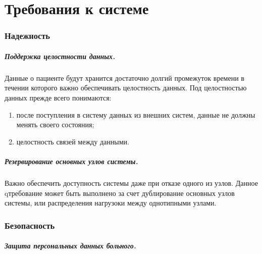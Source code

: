 \section{Требования к системе}

\subsubsection{Надежность}
\subparagraph{Поддержка целостности данных.}
Данные о пациенте будут хранится достаточно долгий промежуток времени в течении которого важно обеспечивать целостность данных. Под целостностью данных прежде всего понимаются:

\begin{enumerate}
  \item после поступления в систему данных из внешних систем, данные не должны
  менять своего состояния;
  \item целостность связей между данными. 
\end{enumerate}

\subparagraph{Резервирование основных узлов системы.}
Важно обеспечить доступность системы даже при отказе одного из узлов. Данное
qтребование может быть выполнено за счет дублирование основных узлов системы,
или распределения нагрузоки между однотипными узлами.

\subsubsection{Безопасность}
\subparagraph{Защита персональных данных больного.}


